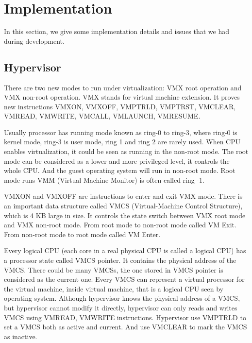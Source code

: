 

\section{Implementation}
\label{sec:implementation}

In this section, we give some implementation details and issues that we had during development.

\subsection{Hypervisor}


There are two new modes to run under virtualization: VMX root operation and VMX non-root operation. VMX stands for virtual machine extension. It proves new instructions VMXON, VMXOFF, VMPTRLD, VMPTRST, VMCLEAR, VMREAD, VMWRITE, VMCALL, VMLAUNCH, VMRESUME.

Usually processor has running mode known as ring-0 to ring-3, where ring-0 is kernel mode, ring-3 is user mode, ring 1 and ring 2 are rarely used. When CPU enables virtualization, it could be seen as running in the non-root mode. The root mode can be considered as a lower and more privileged level, it controls the whole CPU. And the guest operating system will run in non-root mode. Root mode runs VMM (Virtual Machine Monitor) is often called ring -1.

VMXON and VMXOFF are instructions to enter and exit VMX mode. There is an important data structure called VMCS (Virtual-Machine Control Structure), which is 4 KB large in size. It controls the state switch between VMX root mode and VMX non-root mode. From root mode to non-root mode called VM Exit. From non-root mode to root mode called VM Enter.

Every logical CPU (each core in a real physical CPU is called a logical CPU) has a processor state called VMCS pointer. It contains the physical address of the VMCS. There could be many VMCSs, the one stored in VMCS pointer is considered as the current one. Every VMCS can represent a virtual processor for the virtual machine, inside virtual machine, that is a logical CPU seen by operating system. Although hypervisor knows the physical address of a VMCS, but hypervisor cannot modify it directly, hypervisor can only reads and writes VMCS using VMREAD, VMWRITE instructions. Hypervisor use VMPTRLD to set a VMCS both as active and current. And use VMCLEAR to mark the VMCS as inactive.

